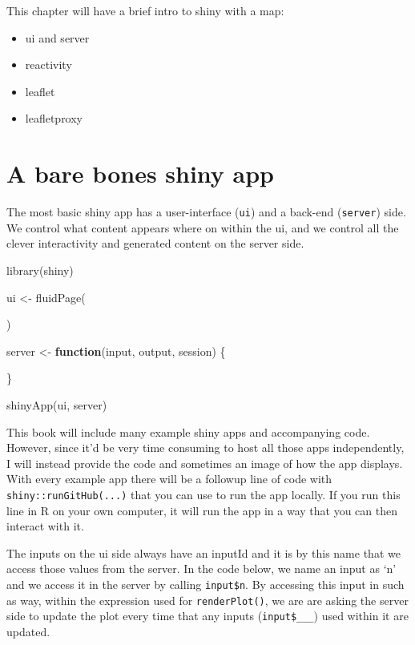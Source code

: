\documentclass[
]{book}
\newenvironment{Shaded}{\begin{snugshade}}{\end{snugshade}}
\newcommand{\ControlFlowTok}[1]{\textcolor[rgb]{0.13,0.29,0.53}{\textbf{#1}}}
\newcommand{\FunctionTok}[1]{\textcolor[rgb]{0.00,0.00,0.00}{#1}}
\newcommand{\NormalTok}[1]{#1}
\newcommand{\OtherTok}[1]{\textcolor[rgb]{0.56,0.35,0.01}{#1}}
\providecommand{\tightlist}{%
  \setlength{\itemsep}{0pt}\setlength{\parskip}{0pt}}
\begin{document}
This chapter will have a brief intro to shiny with a map:

\begin{itemize}
\tightlist
\item
  ui and server
\item
  reactivity
\item
  leaflet
\item
  leafletproxy
\end{itemize}

\hypertarget{a-bare-bones-shiny-app}{%
\section{A bare bones shiny app}\label{a-bare-bones-shiny-app}}

The most basic shiny app has a user-interface (\texttt{ui}) and a back-end (\texttt{server}) side. We control what content appears where on within the ui, and we control all the clever interactivity and generated content on the server side.

\begin{Shaded}
\begin{Highlighting}[]
\FunctionTok{library}\NormalTok{(shiny)}

\NormalTok{ui }\OtherTok{\textless{}{-}} \FunctionTok{fluidPage}\NormalTok{(}
  
\NormalTok{)}

\NormalTok{server }\OtherTok{\textless{}{-}} \ControlFlowTok{function}\NormalTok{(input, output, session) \{}
  
\NormalTok{\}}

\FunctionTok{shinyApp}\NormalTok{(ui, server)}
\end{Highlighting}
\end{Shaded}

This book will include many example shiny apps and accompanying code. However, since it'd be very time consuming to host all those apps independently, I will instead provide the code and sometimes an image of how the app displays. With every example app there will be a followup line of code with \texttt{shiny::runGitHub(...)} that you can use to run the app locally. If you run this line in R on your own computer, it will run the app in a way that you can then interact with it.

The inputs on the ui side always have an inputId and it is by this name that we access those values from the server. In the code below, we name an input as `n' and we access it in the server by calling \texttt{input\$n}. By accessing this input in such as way, within the expression used for \texttt{renderPlot()}, we are are asking the server side to update the plot every time that any inputs (\texttt{input\$\_\_\_}) used within it are updated.
\end{document}
